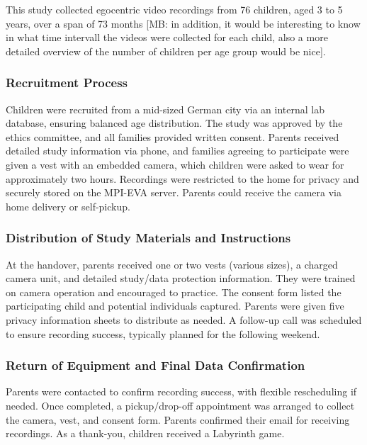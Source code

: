 \documentclass[
  man,floatsintext]{apa6}
\begin{document}
This study collected egocentric video recordings from 76 children, aged 3 to 5 years, over a span of 73 months {[}MB: in addition, it would be interesting to know in what time intervall the videos were collected for each child, also a more detailed overview of the number of children per age group would be nice{]}.

\subsubsection{Recruitment Process}\label{recruitment-process}

Children were recruited from a mid-sized German city via an internal lab database, ensuring balanced age distribution. The study was approved by the ethics committee, and all families provided written consent. Parents received detailed study information via phone, and families agreeing to participate were given a vest with an embedded camera, which children were asked to wear for approximately two hours. Recordings were restricted to the home for privacy and securely stored on the MPI-EVA server. Parents could receive the camera via home delivery or self-pickup.

\subsubsection{Distribution of Study Materials and Instructions}\label{distribution-of-study-materials-and-instructions}

At the handover, parents received one or two vests (various sizes), a charged camera unit, and detailed study/data protection information. They were trained on camera operation and encouraged to practice. The consent form listed the participating child and potential individuals captured. Parents were given five privacy information sheets to distribute as needed. A follow-up call was scheduled to ensure recording success, typically planned for the following weekend.

\subsubsection{Return of Equipment and Final Data Confirmation}\label{return-of-equipment-and-final-data-confirmation}

Parents were contacted to confirm recording success, with flexible rescheduling if needed. Once completed, a pickup/drop-off appointment was arranged to collect the camera, vest, and consent form. Parents confirmed their email for receiving recordings. As a thank-you, children received a Labyrinth game.
\end{document}
